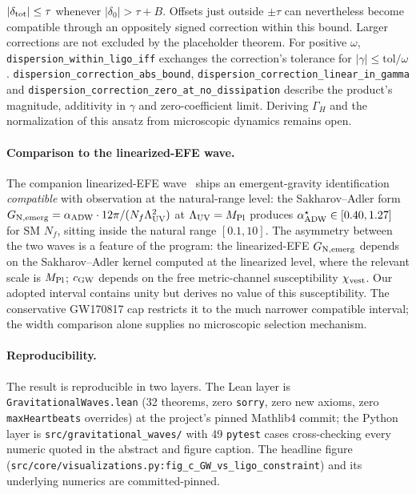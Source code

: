\documentclass[aps,prl,reprint,nofootinbib,superscriptaddress]{revtex4-2}
\newcommand{\cGW}{c_{\rm GW}}
\newcommand{\chivest}{\chi_{\rm vest}}
\begin{document}
\begin{enumerate}
$|\delta_{\rm tot}|\leq\tau$ whenever $|\delta_0|>\tau+B$.
Offsets just outside $\pm\tau$ can nevertheless become compatible
through an oppositely signed correction within this bound.
Larger corrections are not excluded by the placeholder theorem.
For positive $\omega$, \texttt{dispersion\_within\_ligo\_iff}
exchanges the correction's tolerance for
$|\gamma|\leq\mathrm{tol}/\omega$.
\texttt{dispersion\_correction\_abs\_bound},
\texttt{dispersion\_correction\_linear\_in\_gamma} and
\texttt{dispersion\_correction\_zero\_at\_no\_dissipation} describe
the product's magnitude, additivity in $\gamma$ and zero-coefficient
limit.
Deriving $\Gamma_H$ and the normalization of this ansatz from
microscopic dynamics remains open.
\end{enumerate}

\paragraph{Comparison to the linearized-EFE wave.} The companion
linearized-EFE wave~\cite{Roehm2026LinearizedEFE} ships an
emergent-gravity identification \emph{compatible} with observation at
the natural-range level: the Sakharov--Adler form
$G_{\rm N,emerg} = \alpha_{\rm ADW} \cdot 12\pi/(N_f \Lambda_{\rm UV}^2)$
at $\Lambda_{\rm UV} = M_{\rm Pl}$ produces
$\alpha_{\rm ADW}^\star \in [0.40, 1.27]$ for SM $N_f$, sitting
inside the natural range $[0.1,10]$. The asymmetry between the two
waves is a feature of the program: the linearized-EFE
$G_{\rm N,emerg}$ depends on the Sakharov--Adler kernel computed at
the linearized level, where the relevant scale is $M_{\rm Pl}$;
$\cGW$ depends on the free metric-channel susceptibility
$\chivest$. Our adopted interval contains unity but derives no
value of this susceptibility. The conservative GW170817 cap
restricts it to the much narrower compatible interval; the
width comparison alone supplies no microscopic selection mechanism.

\paragraph{Reproducibility.} The result is reproducible in two
layers. The Lean layer is \texttt{GravitationalWaves.lean} (32
theorems, zero \texttt{sorry}, zero new axioms, zero
\texttt{maxHeartbeats} overrides) at the project's pinned
Mathlib4 commit; the Python layer is \texttt{src/gravitational\_waves/}
with 49 \texttt{pytest} cases cross-checking every numeric quoted
in the abstract and figure caption. The headline figure
(\texttt{src/core/visualizations.py:fig\_c\_GW\_vs\_ligo\_constraint})
and its underlying numerics are committed-pinned.
\end{document}
